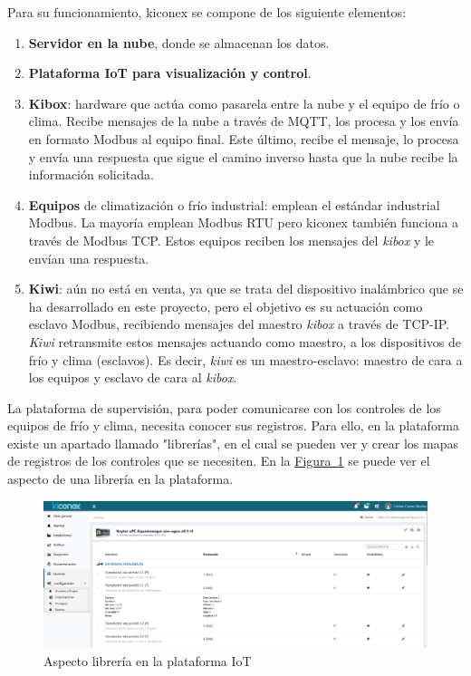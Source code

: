 Para su funcionamiento, kiconex se compone de los siguiente elementos:
\begin{enumerate}
  \item \textbf{Servidor en la nube}, donde se almacenan los datos.
  \item \textbf{Plataforma IoT para visualización y control}.  
  \item \textbf{Kibox}: hardware que actúa como pasarela entre la nube y el equipo de frío o clima. Recibe mensajes de la nube a través de MQTT, los procesa y los envía en formato Modbus al equipo final. Este último, recibe el mensaje, lo procesa y envía una respuesta que sigue el camino inverso hasta que la nube recibe la información solicitada. 
  \item \textbf{Equipos} de climatización o frío industrial: emplean el estándar industrial Modbus. La mayoría emplean Modbus RTU pero kiconex también funciona a través de Modbus TCP. Estos equipos reciben los mensajes del \textit{kibox} y le envían una respuesta.
  \item \textbf{Kiwi}: aún no está en venta, ya que se trata del dispositivo inalámbrico que se ha desarrollado en este proyecto, pero el objetivo es su actuación como esclavo Modbus, recibiendo mensajes del maestro \textit{kibox} a través de TCP-IP. \textit{Kiwi} retransmite estos mensajes actuando como maestro, a los dispositivos de frío y clima (esclavos). Es decir, \textit{kiwi} es un maestro-esclavo: maestro de cara a los equipos y esclavo de cara al \textit{kibox}.
\end{enumerate}



La plataforma de supervisión, para poder comunicarse con los controles de los equipos de frío y clima, necesita conocer sus registros. Para ello, en la plataforma existe un apartado llamado "librerías", en el cual se pueden ver y crear los mapas de registros de los controles que se necesiten. En la \hyperref[figura:libreriaPlataforma]{Figura~\ref{figura:libreriaPlataforma}} se puede ver el aspecto de una librería en la plataforma.

\begin{figure}[H]
  \centering
  \includegraphics[width=\textwidth, keepaspectratio]{img/libreriaKiconex}
  \caption{Aspecto librería en la plataforma IoT}
  \label{figura:libreriaPlataforma}
\end{figure}

